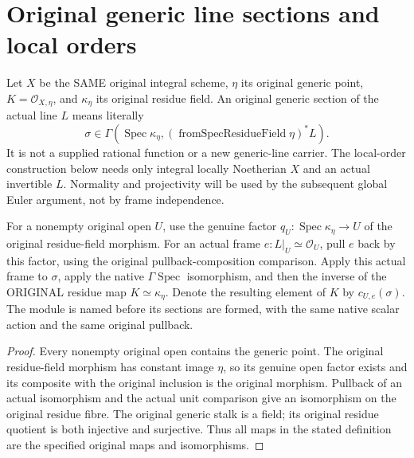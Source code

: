 \section{Original generic line sections and local orders}

Let $X$ be the SAME original integral scheme, $\eta$ its original generic
point, $K=\mathcal O_{X,\eta}$, and $\kappa_\eta$ its original residue
field.  An original generic section of the actual line $L$ means literally
\[
 \sigma\in\Gamma(\operatorname{Spec}\kappa_\eta,
             (\operatorname{fromSpecResidueField}\eta)^*L).
\]
It is not a supplied rational function or a new generic-line carrier.
The local-order construction below needs only integral locally Noetherian
$X$ and an actual invertible $L$.  Normality and projectivity will be used
by the subsequent global Euler argument, not by frame independence.

\begin{definition}
\label{def:curve-generic-section-original-coefficient}
\leanok
{}
For a nonempty original open $U$, use the genuine factor
$q_U:\operatorname{Spec}\kappa_\eta\to U$ of the original residue-field
morphism.  For an actual frame $e:L|_U\simeq\mathcal O_U$, pull $e$ back by
this factor, using the original pullback-composition comparison.  Apply
this actual frame to $\sigma$, apply the native $\Gamma\operatorname{Spec}$
isomorphism, and then the inverse of the ORIGINAL residue map
$K\simeq\kappa_\eta$.  Denote the resulting element of $K$ by
$c_{U,e}(\sigma)$.  The module is named before its sections are formed,
with the same native scalar action and the same original pullback.
\end{definition}
\begin{proof}
Every nonempty original open contains the generic point.  The original
residue-field morphism has constant image $\eta$, so its genuine open
factor exists and its composite with the original inclusion is the
original morphism.  Pullback of an actual isomorphism and the actual
unit comparison give an isomorphism on the original residue fibre.
The original generic stalk is a field; its original residue quotient
is both injective and surjective.  Thus all maps in the stated
definition are the specified original maps and isomorphisms.
\end{proof}

